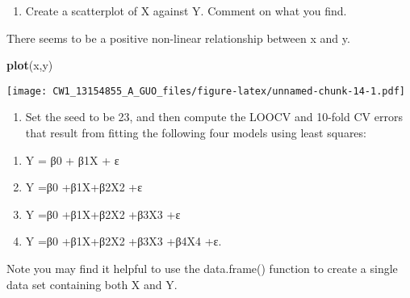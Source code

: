 \documentclass[]{article}
\newenvironment{Shaded}{\begin{snugshade}}{\end{snugshade}}
\newcommand{\KeywordTok}[1]{\textcolor[rgb]{0.13,0.29,0.53}{\textbf{#1}}}
\newcommand{\DataTypeTok}[1]{\textcolor[rgb]{0.13,0.29,0.53}{#1}}
\newcommand{\DecValTok}[1]{\textcolor[rgb]{0.00,0.00,0.81}{#1}}
\newcommand{\StringTok}[1]{\textcolor[rgb]{0.31,0.60,0.02}{#1}}
\newcommand{\CommentTok}[1]{\textcolor[rgb]{0.56,0.35,0.01}{\textit{#1}}}
\newcommand{\OperatorTok}[1]{\textcolor[rgb]{0.81,0.36,0.00}{\textbf{#1}}}
\newcommand{\NormalTok}[1]{#1}
\providecommand{\tightlist}{%
  \setlength{\itemsep}{0pt}\setlength{\parskip}{0pt}}
\begin{document}
\begin{enumerate}
\def\labelenumi{(\alph{enumi})}
\setcounter{enumi}{1}
\tightlist
\item
  Create a scatterplot of X against Y. Comment on what you find.
\end{enumerate}

There seems to be a positive non-linear relationship between x and y.

\begin{Shaded}
\begin{Highlighting}[]
\KeywordTok{plot}\NormalTok{(x,y)}
\end{Highlighting}
\end{Shaded}

\texttt{[image: CW1\_13154855\_A\_GUO\_files/figure-latex/unnamed-chunk-14-1.pdf]}

\begin{enumerate}
\def\labelenumi{(\alph{enumi})}
\setcounter{enumi}{2}
\tightlist
\item
  Set the seed to be 23, and then compute the LOOCV and 10-fold CV
  errors that result from fitting the following four models using least
  squares:
\end{enumerate}

\begin{enumerate}
\def\labelenumi{\roman{enumi}.}
\tightlist
\item
  Y = β0 + β1X + ε
\item
  Y =β0 +β1X+β2X2 +ε
\item
  Y =β0 +β1X+β2X2 +β3X3 +ε
\item
  Y =β0 +β1X+β2X2 +β3X3 +β4X4 +ε.
\end{enumerate}

Note you may find it helpful to use the data.frame() function to create
a single data set containing both X and Y.

\begin{Shaded}
\end{Shaded}
\end{document}
